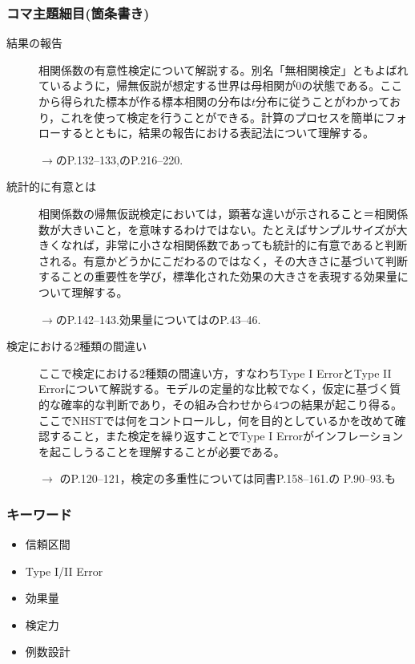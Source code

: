 \subsubsection{コマ主題細目(箇条書き)}
\begin{description}
	\item[結果の報告]相関係数の有意性検定について解説する。別名「無相関検定」ともよばれているように，帰無仮説が想定する世界は母相関が0の状態である。ここから得られた標本が作る標本相関の分布は$t$分布に従うことがわかっており，これを使って検定を行うことができる。計算のプロセスを簡単にフォローするとともに，結果の報告における表記法について理解する。
	      \begin{flushright}
		      $\to$\textcite{Yamada2004}のP.132--133,\textcite{Yamauchi201001}のP.216--220.
	      \end{flushright}

	\item[統計的に有意とは]相関係数の帰無仮説検定においては，顕著な違いが示されること＝相関係数が大きいこと，を意味するわけではない。たとえばサンプルサイズが大きくなれば，非常に小さな相関係数であっても統計的に有意であると判断される。有意かどうかにこだわるのではなく，その大きさに基づいて判断することの重要性を学び，標準化された効果の大きさを表現する効果量について理解する。
	      \begin{flushright}
		      $\to$\textcite{Yamada2004}のP.142--143.効果量については\textcite{Matia201201}のP.43--46.
	      \end{flushright}

	\item[検定における2種類の間違い]ここで検定における2種類の間違い方，すなわちType I ErrorとType II Errorについて解説する。モデルの定量的な比較でなく，仮定に基づく質的な確率的な判断であり，その組み合わせから4つの結果が起こり得る。ここでNHSTでは何をコントロールし，何を目的としているかを改めて確認すること，また検定を繰り返すことでType I Errorがインフレーションを起こしうることを理解することが必要である。
	      \begin{flushright}
		      $\to$ \textcite{Yamada2004}のP.120--121，検定の多重性については同書P.158--161.\textcite{Kawabata201408}の P.90--93.も
	      \end{flushright}

\end{description}
\subsubsection{キーワード}
\begin{itemize}
	\item 信頼区間
	\item Type I/II Error
	\item 効果量
	\item 検定力
	\item 例数設計
\end{itemize}
